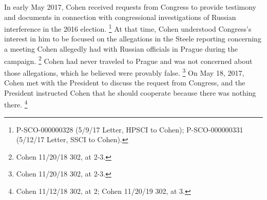 {In early May 2017, Cohen received requests from Congress to provide testimony and documents in connection with congressional investigations of Russian interference in the 2016 election.%
\footnote{P-SCO-000000328 (5/9/17 Letter, HPSCI to Cohen);
P-SCO-000000331 (5/12/17 Letter, SSCI to Cohen).}
At that time, Cohen understood Congress's interest in him to be focused on the allegations in the Steele reporting concerning a meeting Cohen allegedly had with Russian officials in Prague during the campaign.%
\footnote{Cohen 11/20/18 302, at 2-3.}
Cohen had never traveled to Prague and was not concerned about those allegations, which he believed were provably false.%
\footnote{Cohen 11/20/18 302, at 2-3.}
On May 18, 2017, Cohen met with the President to discuss the request from Congress, and the President instructed Cohen that he should cooperate because there was nothing there.%
\footnote{Cohen 11/12/18 302, at 2;
Cohen 11/20/19 302, at 3.}

}
